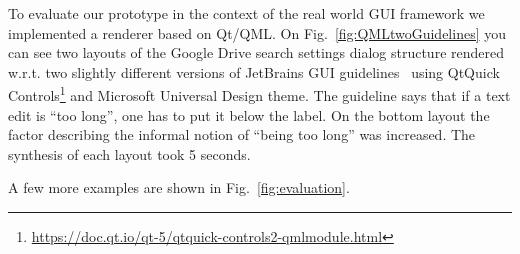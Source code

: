 


To evaluate our prototype in the context of the real world GUI framework we implemented a renderer based on Qt/QML. 
On Fig.~\ref{fig:QMLtwoGuidelines} you can see two layouts of the
Google Drive search settings dialog structure rendered  w.r.t. two slightly different versions of JetBrains GUI guidelines~\cite{JBG} using QtQuick Controls\footnote{\url{https://doc.qt.io/qt-5/qtquick-controls2-qmlmodule.html}} and Microsoft Universal Design theme. 
The guideline says that if a text edit is ``too long'', one has to put it below the label.
On the bottom layout the factor describing the informal notion of ``being too long'' was increased. 
The synthesis of each layout took 5 seconds.

A few more examples are shown in Fig.~\ref{fig:evaluation}.


